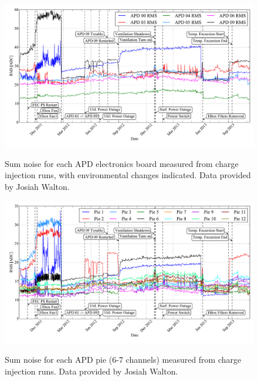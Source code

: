 \begin{figure}
\begin{center}
\includegraphics[keepaspectratio=true,width=\textwidth]{APDNoiseVsActions_boards.pdf}
\end{center}
\renewcommand{\baselinestretch}{1}
\small\normalsize
\begin{quote}
\caption{Sum noise for each APD electronics board measured from charge injection runs, with environmental changes indicated.  Data provided by Josiah Walton.}
\label{fig:APDSumBoardNoise_JosiahEnvironmental}
\end{quote}
\end{figure}
\renewcommand{\baselinestretch}{2}
\small\normalsize

\begin{figure}
\begin{center}
\includegraphics[keepaspectratio=true,width=\textwidth]{APDNoiseVsActions_pies.pdf}
\end{center}
\renewcommand{\baselinestretch}{1}
\small\normalsize
\begin{quote}
\caption{Sum noise for each APD pie (6-7 channels) measured from charge injection runs.  Data provided by Josiah Walton.}
\label{fig:APDSumPieNoise_JosiahEnvironmental}
\end{quote}
\end{figure}
\renewcommand{\baselinestretch}{2}
\small\normalsize

